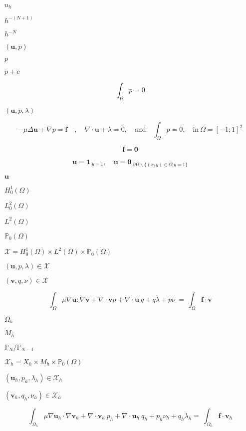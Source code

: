 \documentclass{article}
\begin{document}
$u_h$
\pagebreak

$h^{-(N+1)}$
\pagebreak

$h^{-N}$
\pagebreak

$(\mathbf{u},p)$
\pagebreak

$p$
\pagebreak

$p+c$
\pagebreak

\[ \label{eq:26} \int_\Omega p = 0 \]
\pagebreak

$(\mathbf{u},p,\lambda)$
\pagebreak

\[ - \mu \Delta \mathbf{u} +\nabla p = \mathbf{f}\quad, \quad \nabla \cdot \mathbf{u} + \lambda = 0, \quad \text{and}\quad \int_\Omega p = 0,\quad \text{in}\ \Omega = [-1;1]^2 \]
\pagebreak

\[ \mathbf{f} = \mathbf{0} \]
\pagebreak

\[ \mathbf{u}=\mathbf{1}_{|y=1}, \quad \mathbf{u}=\mathbf{0}_{|\partial \Omega \backslash \{(x,y) \in \Omega | y=1\}} \]
\pagebreak

$\mathbf{u}$
\pagebreak

$H^1_0(\Omega)$
\pagebreak

$L^2_0(\Omega)$
\pagebreak

$L^2(\Omega)$
\pagebreak

$\mathbb{P}_0(\Omega)$
\pagebreak

$\mathcal{X} = H^1_0(\Omega)\times L^2(\Omega)\times\mathbb{P}_0(\Omega)$
\pagebreak

$(\mathbf{u}, p, \lambda) \in \mathcal{X}$
\pagebreak

$(\mathbf{v},q,\nu) \in \mathcal{X}$
\pagebreak

\[ \int_\Omega \mu \nabla \mathbf{u} : \nabla \mathbf{v} + \nabla \cdot \mathbf{v} p + \nabla \cdot \mathbf{u}\ q + q \lambda + p \nu \ = \ \int_\Omega \mathbf{f} \cdot \mathbf{v} \]
\pagebreak

$\Omega_h$
\pagebreak

$M_h$
\pagebreak

$\mathbb{P}_N/\mathbb{P}_{N-1}$
\pagebreak

$\mathcal{X}_h=X_h\times M_h \times \mathbb{P}_0(\Omega)$
\pagebreak

$(\mathbf{u}_h,p_h,\lambda_h) \in \mathcal{X}_h$
\pagebreak

$(\mathbf{v}_h,q_h,\nu_h) \in \mathcal{X}_h$
\pagebreak

\[ \label{eq:27} \int_{\Omega_h} \mu \nabla \mathbf{u}_h \cdot \nabla \mathbf{v}_h + \nabla \cdot \mathbf{v}_h \ p_h + \nabla \cdot \mathbf{u}_h\ q_h + p_h \nu_h + q_h \lambda_h = \ \int_{\Omega_h} \mathbf{f} \cdot \mathbf{v}_h \]
\pagebreak
\end{document}
